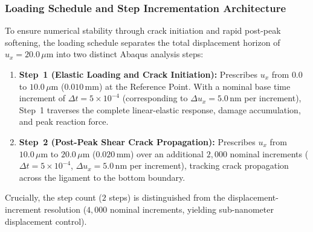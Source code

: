 \subsubsection{Loading Schedule and Step Incrementation Architecture}
To ensure numerical stability through crack initiation and rapid post-peak softening, the loading schedule separates the total displacement horizon of $u_x = 20.0\,\mu\mathrm{m}$ into two distinct Abaqus analysis steps:
\begin{enumerate}
  \item \textbf{Step~1 (Elastic Loading and Crack Initiation):} Prescribes $u_x$ from $0.0$ to $10.0\,\mu\mathrm{m}$ ($0.010\,\mathrm{mm}$) at the Reference Point. With a nominal base time increment of $\Delta t = 5\times 10^{-4}$ (corresponding to $\Delta u_x = 5.0\,\mathrm{nm}$ per increment), Step~1 traverses the complete linear-elastic response, damage accumulation, and peak reaction force.
  \item \textbf{Step~2 (Post-Peak Shear Crack Propagation):} Prescribes $u_x$ from $10.0\,\mu\mathrm{m}$ to $20.0\,\mu\mathrm{m}$ ($0.020\,\mathrm{mm}$) over an additional $2{,}000$ nominal increments ($\Delta t = 5\times 10^{-4}$, $\Delta u_x = 5.0\,\mathrm{nm}$ per increment), tracking crack propagation across the ligament to the bottom boundary.
\end{enumerate}
Crucially, the step count ($2$ steps) is distinguished from the displacement-increment resolution ($4{,}000$ nominal increments, yielding sub-nanometer displacement control).

